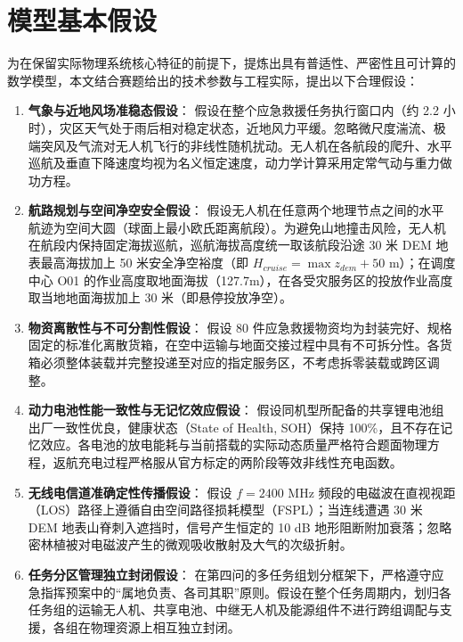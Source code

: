 \section{模型基本假设}

为在保留实际物理系统核心特征的前提下，提炼出具有普适性、严密性且可计算的数学模型，本文结合赛题给出的技术参数与工程实际，提出以下合理假设：

\begin{enumerate}
    \item \textbf{气象与近地风场准稳态假设}：
    假设在整个应急救援任务执行窗口内（约 2.2 小时），灾区天气处于雨后相对稳定状态，近地风力平缓。忽略微尺度湍流、极端突风及气流对无人机飞行的非线性随机扰动。无人机在各航段的爬升、水平巡航及垂直下降速度均视为名义恒定速度，动力学计算采用定常气动与重力做功方程。
    
    \item \textbf{航路规划与空间净空安全假设}：
    假设无人机在任意两个地理节点之间的水平航迹为空间大圆（球面上最小欧氏距离航段）。为避免山地撞击风险，无人机在航段内保持固定海拔巡航，巡航海拔高度统一取该航段沿途 30 米 DEM 地表最高海拔加上 50 米安全净空裕度（即 $H_{cruise} = \max z_{dem} + 50\text{ m}$）；在调度中心 O01 的作业高度取地面海拔（127.7m），在各受灾服务区的投放作业高度取当地地面海拔加上 30 米（即悬停投放净空）。
    
    \item \textbf{物资离散性与不可分割性假设}：
    假设 80 件应急救援物资均为封装完好、规格固定的标准化离散货箱，在空中运输与地面交接过程中具有不可拆分性。各货箱必须整体装载并完整投递至对应的指定服务区，不考虑拆零装载或跨区调整。
    
    \item \textbf{动力电池性能一致性与无记忆效应假设}：
    假设同机型所配备的共享锂电池组出厂一致性优良，健康状态（State of Health, SOH）保持 100\%，且不存在记忆效应。各电池的放电能耗与当前搭载的实际动态质量严格符合题面物理方程，返航充电过程严格服从官方标定的两阶段等效非线性充电函数。
    
    \item \textbf{无线电信道准确定性传播假设}：
    假设 $f=2400\text{ MHz}$ 频段的电磁波在直视视距（LOS）路径上遵循自由空间路径损耗模型（FSPL）；当连线遭遇 30 米 DEM 地表山脊刺入遮挡时，信号产生恒定的 10 dB 地形阻断附加衰落；忽略密林植被对电磁波产生的微观吸收散射及大气的次级折射。
    
    \item \textbf{任务分区管理独立封闭假设}：
    在第四问的多任务组划分框架下，严格遵守应急指挥预案中的“属地负责、各司其职”原则。假设在整个任务周期内，划归各任务组的运输无人机、共享电池、中继无人机及能源组件不进行跨组调配与支援，各组在物理资源上相互独立封闭。
\end{enumerate}
